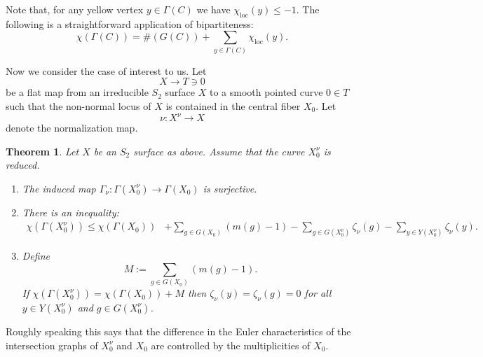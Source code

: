 \documentclass[JEP,XML,SOM,Unicode,NoFloatCountersInSection,published]{cedram}
\theoremstyle{plain}
\newtheorem{theorem}{Theorem}[section]
\theoremstyle{definition}
\newcommand\loc{{\mathrm{loc}}}
\newcommand\cl{{\colon}}
\begin{document}
Note that, for any yellow vertex $y\in \Gamma(C)$ we have $\chi_\loc(y)\le -1$. The following is a straightforward application of bipartiteness:
\begin{equation}\label{eulercharequality}
\chi(\Gamma(C)) = \#(G(C))+\sum_{y\in \Gamma(C)}\chi_\loc(y).
\end{equation}

Now we consider the case of interest to us. Let
\[
X\to T\ni 0
\]
be a flat map from an irreducible $S_2$ surface $X$ to a smooth pointed curve $0\in T$ such that the non-normal locus of $X$ is contained in the central fiber $X_0$. Let
\[
\nu\cl X^\nu \to X
\]
denote the normalization map.

\begin{theorem}\label{normalizationdualgraphproperties}
Let $X$ be an $S_2$ surface as above. Assume that the curve $X^\nu_0$ is reduced.
\begin{enumerate}
\item\label{normalizationdualgraphproperties1} The induced map $\Gamma_\nu\cl \Gamma(X^\nu_0)\to \Gamma(X_0)$ is surjective.
\item\label{normalizationdualgraphproperties2} There is an inequality:
\begin{align*}
\chi(\Gamma(X^\nu_0))\le \chi(\Gamma(X_0))&+\sum_{g\in G(X_0)} \left(m(g)-1\right) -\sum_{g\in G(X_0^\nu)} \zeta_\nu(g) -\sum_{y\in Y(X_0^\nu)} \zeta_\nu(y).
\end{align*}
\item\label{normalizationdualgraphproperties3}
Define\vspace*{-3pt}
\[
M:=\sum_{g\in G(X_0)} (m(g)-1).
\]
If $\chi(\Gamma(X^\nu_0)) = \chi(\Gamma(X_0))+M$ then $\zeta_\nu(y) =\zeta_\nu(g)= 0$ for all $y\in Y(X_0^\nu)$ and $g\in G(X_0^\nu)$.
\end{enumerate}
\end{theorem}

Roughly speaking this says that the difference in the Euler characteristics of the intersection graphs of $X_0^\nu$ and $X_0$ are controlled by the multiplicities of $X_0$.
\end{document}
